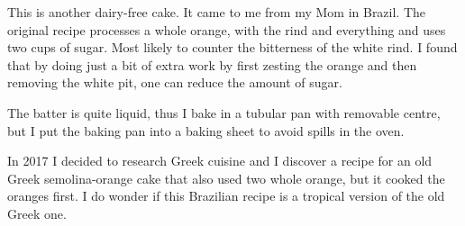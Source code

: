 \documentclass[11pt,letterpaper]{article}
\begin{document}


This is another dairy-free cake. It came to me from my Mom in Brazil. The original recipe processes a whole orange, with the rind and everything and uses two cups of sugar. Most likely to counter the bitterness of the white rind. I found that by doing just a bit of extra work by first zesting the orange and then removing the white pit, one can reduce the amount of sugar. 

The batter is quite liquid, thus I bake in a tubular pan with removable centre, but I put the baking pan into a baking sheet to avoid spills in the oven.

In 2017 I decided to research Greek cuisine and I discover a recipe for an old Greek semolina-orange cake that also used two whole orange, but it cooked the oranges first. I do wonder if this Brazilian recipe is a tropical version of the old Greek one.
\end{document}
